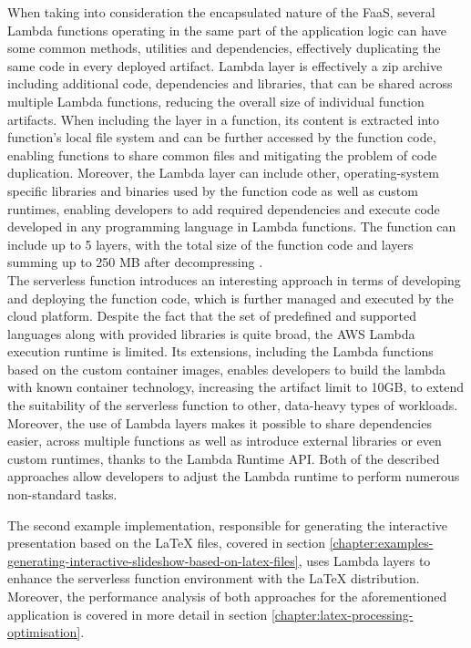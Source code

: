 When taking into consideration the encapsulated nature of the FaaS, several Lambda functions operating in the same part of the application logic can have some common methods, utilities and dependencies, effectively duplicating the same code in every deployed artifact.
Lambda layer is effectively a zip archive including additional code, dependencies and libraries, that can be shared across multiple Lambda functions, reducing the overall size of individual function artifacts.
When including the layer in a function, its content is extracted into function's local file system and can be further accessed by the function code, enabling functions to share common files and mitigating the problem of code duplication.
Moreover, the Lambda layer can include other, operating-system specific libraries and binaries used by the function code as well as custom runtimes, enabling developers to add required dependencies and execute code developed in any programming language in Lambda functions.
The function can include up to 5 layers, with the total size of the function code and layers summing up to 250 MB after decompressing \cite{AWSLambdaLayer}. \\

The serverless function introduces an interesting approach in terms of developing and deploying the function code, which is further managed and executed by the cloud platform. Despite the fact that the set of predefined and supported languages along with provided libraries is quite broad, the AWS Lambda execution runtime is limited.
Its extensions, including the Lambda functions based on the custom container images, enables developers to build the lambda with known container technology, increasing the artifact limit to 10GB, to extend the suitability of the serverless function to other, data-heavy types of workloads.
Moreover, the use of Lambda layers makes it possible to share dependencies easier, across multiple functions as well as introduce external libraries or even custom runtimes, thanks to the Lambda Runtime API.
Both of the described approaches allow developers to adjust the Lambda runtime to perform numerous non-standard tasks.

The second example implementation, responsible for generating the interactive presentation based on the LaTeX files, covered in section \ref{chapter:examples-generating-interactive-slideshow-based-on-latex-files}, uses Lambda layers to enhance the serverless function environment with the LaTeX distribution.
Moreover, the performance analysis of both approaches for the aforementioned application is covered in more detail in section \ref{chapter:latex-processing-optimisation}.

